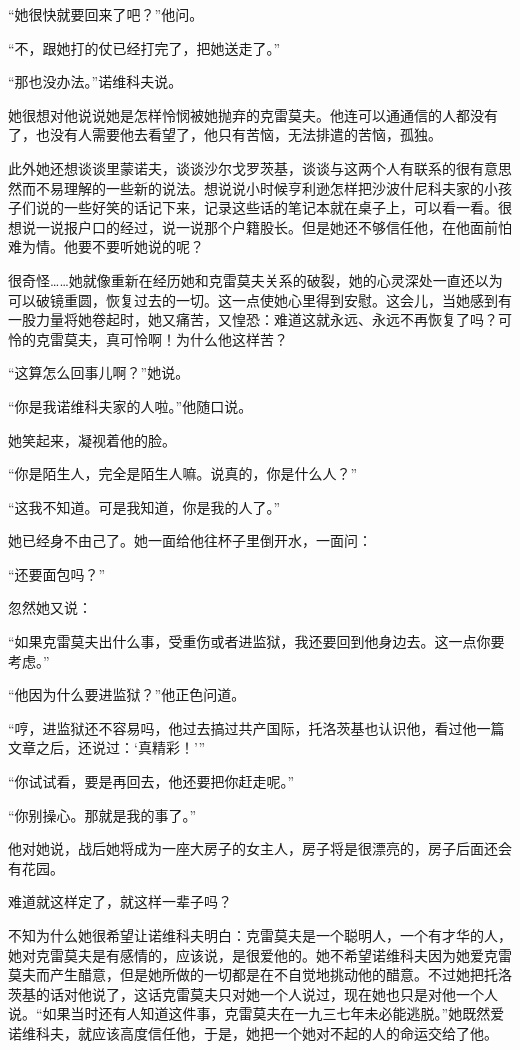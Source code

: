 “她很快就要回来了吧？”他问。

“不，跟她打的仗已经打完了，把她送走了。”

“那也没办法。”诺维科夫说。

她很想对他说说她是怎样怜悯被她抛弃的克雷莫夫。他连可以通通信的人都没有了，也没有人需要他去看望了，他只有苦恼，无法排遣的苦恼，孤独。

此外她还想谈谈里蒙诺夫，谈谈沙尔戈罗茨基，谈谈与这两个人有联系的很有意思然而不易理解的一些新的说法。想说说小时候亨利逊怎样把沙波什尼科夫家的小孩子们说的一些好笑的话记下来，记录这些话的笔记本就在桌子上，可以看一看。很想说一说报户口的经过，说一说那个户籍股长。但是她还不够信任他，在他面前怕难为情。他要不要听她说的呢？

很奇怪……她就像重新在经历她和克雷莫夫关系的破裂，她的心灵深处一直还以为可以破镜重圆，恢复过去的一切。这一点使她心里得到安慰。这会儿，当她感到有一股力量将她卷起时，她又痛苦，又惶恐：难道这就永远、永远不再恢复了吗？可怜的克雷莫夫，真可怜啊！为什么他这样苦？

“这算怎么回事儿啊？”她说。

“你是我诺维科夫家的人啦。”他随口说。

她笑起来，凝视着他的脸。

“你是陌生人，完全是陌生人嘛。说真的，你是什么人？”

“这我不知道。可是我知道，你是我的人了。”

她已经身不由己了。她一面给他往杯子里倒开水，一面问：

“还要面包吗？”

忽然她又说：

“如果克雷莫夫出什么事，受重伤或者进监狱，我还要回到他身边去。这一点你要考虑。”

“他因为什么要进监狱？”他正色问道。

“哼，进监狱还不容易吗，他过去搞过共产国际，托洛茨基也认识他，看过他一篇文章之后，还说过：‘真精彩！’”

“你试试看，要是再回去，他还要把你赶走呢。”

“你别操心。那就是我的事了。”

他对她说，战后她将成为一座大房子的女主人，房子将是很漂亮的，房子后面还会有花园。

难道就这样定了，就这样一辈子吗？

不知为什么她很希望让诺维科夫明白：克雷莫夫是一个聪明人，一个有才华的人，她对克雷莫夫是有感情的，应该说，是很爱他的。她不希望诺维科夫因为她爱克雷莫夫而产生醋意，但是她所做的一切都是在不自觉地挑动他的醋意。不过她把托洛茨基的话对他说了，这话克雷莫夫只对她一个人说过，现在她也只是对他一个人说。“如果当时还有人知道这件事，克雷莫夫在一九三七年未必能逃脱。”她既然爱诺维科夫，就应该高度信任他，于是，她把一个她对不起的人的命运交给了他。

